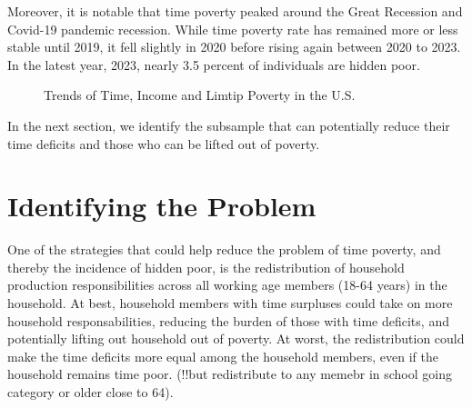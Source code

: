 \documentclass[
  11pt,
]{article}
\begin{document}
Moreover, it is notable that time poverty peaked around the Great
Recession and Covid-19 pandemic recession. While time poverty rate has
remained more or less stable until 2019, it fell slightly in 2020 before
rising again between 2020 to 2023. In the latest year, 2023, nearly 3.5
percent of individuals are hidden poor.

\begin{figure}


\caption{\label{fig-trend}Trends of Time, Income and Limtip Poverty in
the U.S.}

\end{figure}%

In the next section, we identify the subsample that can potentially
reduce their time deficits and those who can be lifted out of poverty.

\section{Identifying the Problem}\label{sec-problem}

One of the strategies that could help reduce the problem of time
poverty, and thereby the incidence of hidden poor, is the redistribution
of household production responsibilities across all working age members
(18-64 years) in the household. At best, household members with time
surpluses could take on more household responsabilities, reducing the
burden of those with time deficits, and potentially lifting out
household out of poverty. At worst, the redistribution could make the
time deficits more equal among the household members, even if the
household remains time poor. (!!but redistribute to any memebr in school
going category or older close to 64).
\end{document}
